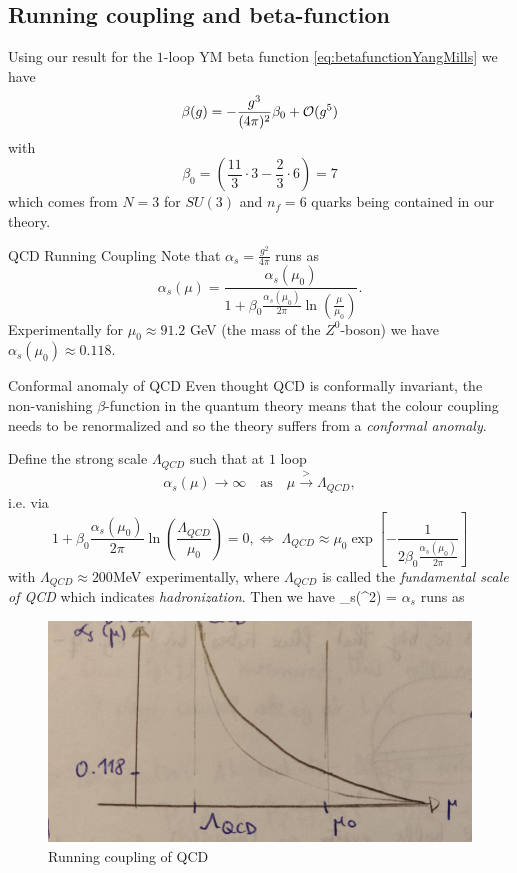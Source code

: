 \subsection{Running coupling and beta-function}
\label{subsec:qcdrunningcoupling}
Using our result for the $1$-loop YM beta function \ref{eq:betafunctionYangMills} we have
\begin{equation}
	\beta(g) = -\frac{g^3}{(4 \pi)^2} \beta_0+ \mathcal{O}(g^5)
\end{equation}
with
\begin{equation}
	\beta_0=\left(\frac{11}{3}\cdot 3 - \frac{2}{3} \cdot 6\right) = 7
\end{equation}
which comes from $N=3$ for $SU(3)$ and $n_f=6$ quarks being contained in our theory.
\begin{mybox}{QCD Running Coupling}
	Note that $\alpha_s =\frac{g^2}{4 \pi}$ runs as
	\begin{equation}
		\label{eq:qcdrunningcoupling}
		\alpha_s(\mu) = \frac{\alpha_s(\mu_0)}{1 + \beta_0 \frac{\alpha_s(\mu_0)}{2 \pi} \ln(\frac{\mu}{\mu_0})}.
	\end{equation}
	Experimentally for $\mu_0\approx 91.2$ GeV (the mass of the $Z^0$-boson) we have $\alpha_s(\mu_0)\approx 0.118$.\\
\end{mybox}
\begin{mybox}{Conformal anomaly of QCD}
		Even thought QCD is conformally invariant, the non-vanishing $\beta$-function in the quantum theory means that the colour coupling needs to be renormalized and so the theory suffers from a  \emph{conformal anomaly}.
\end{mybox}
Define the strong scale $\Lambda_{QCD}$ such that at $1$ loop
\begin{equation}
	\alpha_s(\mu) \rightarrow \infty \quad \text{as} \quad \mu \stackrel{>}{\rightarrow} \Lambda_{QCD},
\end{equation}
i.e. via
\begin{equation*}
	1+\beta_0 \frac{\alpha_s(\mu_0)}{2 \pi} \ln(\frac{\Lambda_{QCD}}{\mu_0}) =0, \Leftrightarrow \; \Lambda_{QCD} \approx \mu_0 \exp \left[- \frac{1}{2 \beta_0 \frac{\alpha_s(\mu_0)}{2 \pi}}\right]
\end{equation*}
with $\Lambda_{QCD}\approx 200$MeV experimentally, where $\Lambda_{QCD}$ is called the \emph{fundamental scale of QCD} which indicates \emph{hadronization}. Then we have
\bse 
\alpha_s(\mu^2) = 
\ese 
$\alpha_s$ runs as 
\begin{figure}[h!]
	\centering
	\includegraphics[width=0.7\linewidth]{gfx/YMpictures/QCDrunningcoupling}
	\caption{Running coupling of QCD}
	\label{fig:qcdrunningcoupling}
\end{figure}
